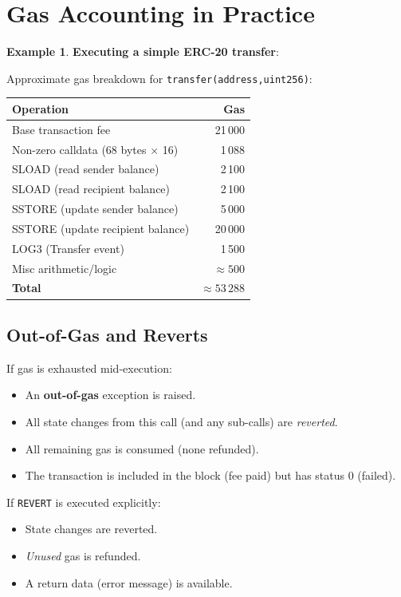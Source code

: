 \documentclass[12pt,a4paper,openany]{book}
\theoremstyle{definition}
\newtheorem{example}{Example}[chapter]
\theoremstyle{plain}
\theoremstyle{remark}
\begin{document}
\section{Gas Accounting in Practice}

\begin{example}
  \textbf{Executing a simple ERC-20 transfer}:

  Approximate gas breakdown for \texttt{transfer(address,uint256)}:
  \begin{table}[h]
  \centering
  \begin{tabular}{lr}
  \toprule
  \textbf{Operation} & \textbf{Gas} \\
  \midrule
  Base transaction fee & 21\,000 \\
  Non-zero calldata (68 bytes $\times$ 16) & 1\,088 \\
  SLOAD (read sender balance) & 2\,100 \\
  SLOAD (read recipient balance) & 2\,100 \\
  SSTORE (update sender balance) & 5\,000 \\
  SSTORE (update recipient balance) & 20\,000 \\
  LOG3 (Transfer event) & 1\,500 \\
  Misc arithmetic/logic & $\approx 500$ \\
  \midrule
  \textbf{Total} & $\approx 53\,288$ \\
  \bottomrule
  \end{tabular}
  \end{table}
\end{example}

\subsection{Out-of-Gas and Reverts}

If gas is exhausted mid-execution:
\begin{itemize}
  \item An \textbf{out-of-gas} exception is raised.
  \item All state changes from this call (and any sub-calls) are
        \emph{reverted}.
  \item All remaining gas is consumed (none refunded).
  \item The transaction is included in the block (fee paid) but has
        status 0 (failed).
\end{itemize}

If \texttt{REVERT} is executed explicitly:
\begin{itemize}
  \item State changes are reverted.
  \item \emph{Unused} gas is refunded.
  \item A return data (error message) is available.
\end{itemize}
\end{document}

